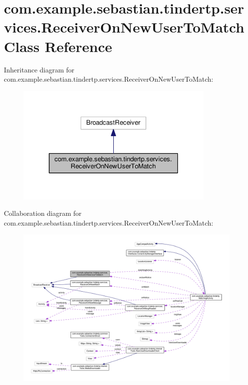 \hypertarget{classcom_1_1example_1_1sebastian_1_1tindertp_1_1services_1_1ReceiverOnNewUserToMatch}{}\section{com.\+example.\+sebastian.\+tindertp.\+services.\+Receiver\+On\+New\+User\+To\+Match Class Reference}
\label{classcom_1_1example_1_1sebastian_1_1tindertp_1_1services_1_1ReceiverOnNewUserToMatch}


Inheritance diagram for com.\+example.\+sebastian.\+tindertp.\+services.\+Receiver\+On\+New\+User\+To\+Match\+:\nopagebreak
\begin{figure}[H]
\begin{center}
\leavevmode
\includegraphics[width=278pt]{classcom_1_1example_1_1sebastian_1_1tindertp_1_1services_1_1ReceiverOnNewUserToMatch__inherit__graph}
\end{center}
\end{figure}


Collaboration diagram for com.\+example.\+sebastian.\+tindertp.\+services.\+Receiver\+On\+New\+User\+To\+Match\+:
\nopagebreak
\begin{figure}[H]
\begin{center}
\leavevmode
\includegraphics[width=350pt]{classcom_1_1example_1_1sebastian_1_1tindertp_1_1services_1_1ReceiverOnNewUserToMatch__coll__graph}
\end{center}
\end{figure}
